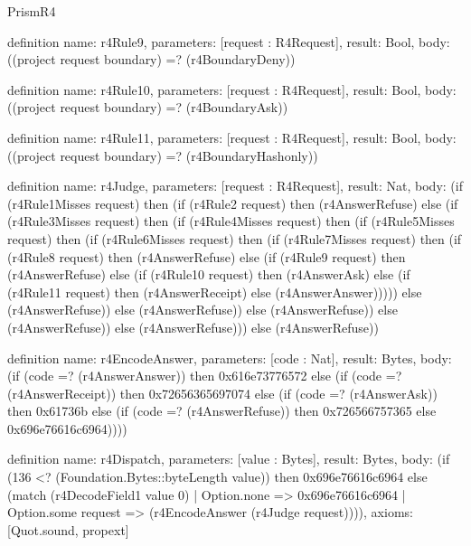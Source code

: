 \begin{lexlean}{PrismR4}
\begin{semanticmodule}
definition{
  name: r4Rule9,
  parameters: [request : R4Request],
  result: Bool,
  body: ((project request boundary) =? (r4BoundaryDeny))
}

definition{
  name: r4Rule10,
  parameters: [request : R4Request],
  result: Bool,
  body: ((project request boundary) =? (r4BoundaryAsk))
}

definition{
  name: r4Rule11,
  parameters: [request : R4Request],
  result: Bool,
  body: ((project request boundary) =? (r4BoundaryHashonly))
}

definition{
  name: r4Judge,
  parameters: [request : R4Request],
  result: Nat,
  body: (if (r4Rule1Misses request) then (if (r4Rule2 request) then (r4AnswerRefuse) else (if (r4Rule3Misses request) then (if (r4Rule4Misses request) then (if (r4Rule5Misses request) then (if (r4Rule6Misses request) then (if (r4Rule7Misses request) then (if (r4Rule8 request) then (r4AnswerRefuse) else (if (r4Rule9 request) then (r4AnswerRefuse) else (if (r4Rule10 request) then (r4AnswerAsk) else (if (r4Rule11 request) then (r4AnswerReceipt) else (r4AnswerAnswer))))) else (r4AnswerRefuse)) else (r4AnswerRefuse)) else (r4AnswerRefuse)) else (r4AnswerRefuse)) else (r4AnswerRefuse))) else (r4AnswerRefuse))
}

definition{
  name: r4EncodeAnswer,
  parameters: [code : Nat],
  result: Bytes,
  body: (if (code =? (r4AnswerAnswer)) then 0x616e73776572 else (if (code =? (r4AnswerReceipt)) then 0x72656365697074 else (if (code =? (r4AnswerAsk)) then 0x61736b else (if (code =? (r4AnswerRefuse)) then 0x726566757365 else 0x696e76616c6964))))
}

definition{
  name: r4Dispatch,
  parameters: [value : Bytes],
  result: Bytes,
  body: (if (136 <? (Foundation.Bytes::byteLength value)) then 0x696e76616c6964 else (match (r4DecodeField1 value 0)
    | Option.none => 0x696e76616c6964
    | Option.some request => (r4EncodeAnswer (r4Judge request)))),
  axioms: [Quot.sound, propext]
}
\end{semanticmodule}
\end{lexlean}
